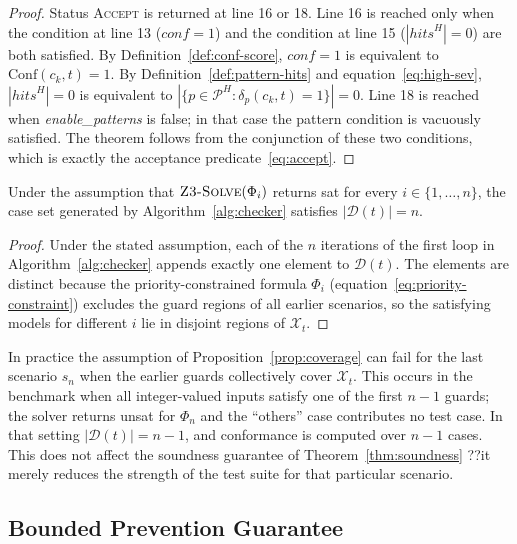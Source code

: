 \begin{proof}
Status \textsc{Accept} is returned at line 16 or 18.  Line 16 is reached
only when the condition at line 13 ($\mathit{conf} = 1$) and the condition
at line 15 ($|\mathit{hits}^H| = 0$) are both satisfied.  By
Definition~\ref{def:conf-score}, $\mathit{conf} = 1$ is equivalent to
$\mathrm{Conf}(c_k, t) = 1$.  By Definition~\ref{def:pattern-hits} and
equation~\eqref{eq:high-sev}, $|\mathit{hits}^H| = 0$ is equivalent to
$|\{p \in \mathcal{P}^H : \delta_p(c_k,t)=1\}| = 0$.  Line 18 is reached
when \textit{enable\_patterns} is false; in that case the pattern condition
is vacuously satisfied.  The theorem follows from the conjunction of these
two conditions, which is exactly the acceptance predicate~\eqref{eq:accept}.
\end{proof}

\begin{proposition}
\label{prop:coverage}
Under the assumption that $\textsc{Z3-Solve}(\Phi_i)$ returns \textsf{sat}
for every $i \in \{1, \ldots, n\}$, the case set generated by
Algorithm~\ref{alg:checker} satisfies $|\mathcal{D}(t)| = n$.
\end{proposition}

\begin{proof}
Under the stated assumption, each of the $n$ iterations of the first loop
in Algorithm~\ref{alg:checker} appends exactly one element to $\mathcal{D}(t)$.
The elements are distinct because the priority-constrained formula $\Phi_i$
(equation~\eqref{eq:priority-constraint}) excludes the guard regions of all
earlier scenarios, so the satisfying models for different $i$ lie in disjoint
regions of $\mathcal{X}_t$.
\end{proof}

\begin{remark}
In practice the assumption of Proposition~\ref{prop:coverage} can fail for
the last scenario $s_n$ when the earlier guards collectively cover
$\mathcal{X}_t$.  This occurs in the benchmark when all integer-valued inputs
satisfy one of the first $n-1$ guards; the solver returns \textsf{unsat} for
$\Phi_n$ and the ``others'' case contributes no test case.  In that setting
$|\mathcal{D}(t)| = n - 1$, and conformance is computed over $n-1$ cases.
This does not affect the soundness guarantee of
Theorem~\ref{thm:soundness} ??it merely reduces the strength of the
test suite for that particular scenario.
\end{remark}

\subsection{Bounded Prevention Guarantee}
\label{subsec:method:prevention}

